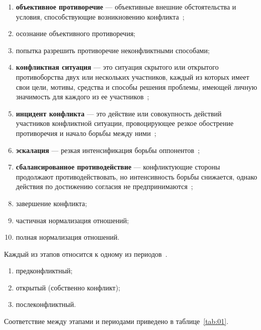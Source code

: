 \begin{enumerate}[label=\arabic*)]
    \item \textbf{объективное противоречие} --- объективные внешние
        обстоятельства и условия, способствующие возникновению
        конфликта~\cite{book01};
    \item осознание объективного противоречия;
    \item попытка разрешить противоречие неконфликтными способами;
    \item \textbf{конфликтная ситуация} --- это ситуация скрытого или открытого
        противоборства двух или нескольких участников, каждый из которых имеет
        свои цели, мотивы, средства и способы решения проблемы, имеющей
        личную значимость для каждого из ее участников~\cite{book04};
    \item \textbf{инцидент конфликта} --- это действие или совокупность действий
        участников конфликтной ситуации, провоцирующее резкое обострение
        противоречия и начало борьбы между ними~\cite{book04};
    \item \textbf{эскалация} --- резкая интенсификация борьбы оппонентов~\cite{book04};
    \item \textbf{сбалансированное противодействие} --- конфликтующие
        стороны продолжают противодействовать, но
        интенсивность борьбы снижается, однако действия по достижению
        согласия не предпринимаются~\cite{book04};
    \item завершение конфликта;
    \item частичная нормализация отношений;
    \item полная нормализация отношений.
\end{enumerate}

Каждый из этапов относится к одному из периодов~\cite{book01}.
\begin{enumerate}[label=\arabic*)]
    \item предконфликтный;
    \item открытый (собственно конфликт);
    \item послеконфликтный.
\end{enumerate}

Соответствие между этапами и периодами приведено в таблице~\ref{tab:01}.

